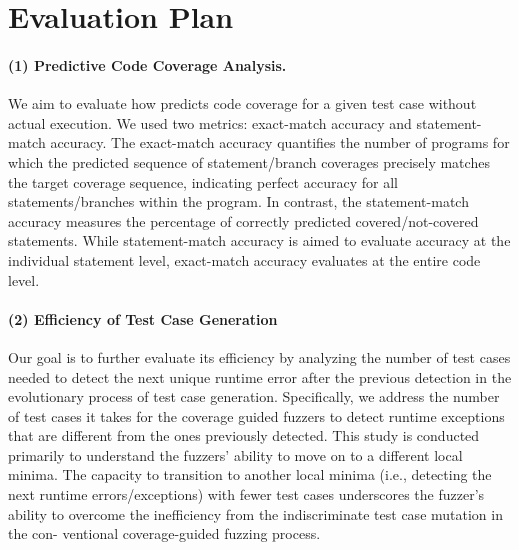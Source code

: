 \section{Evaluation Plan}
\label{eval}






\paragraph{\bf (1) Predictive Code Coverage Analysis.} We aim
to evaluate how {\tool} predicts code coverage for a given
test case without actual execution. We used two metrics: exact-match
accuracy and statement-match accuracy. The exact-match accuracy
quantifies the number of programs for which the predicted sequence of
statement/branch coverages precisely matches the target coverage
sequence, indicating perfect accuracy for all statements/branches
within the program. In contrast, the statement-match accuracy measures
the percentage of correctly predicted covered/not-covered
statements. While statement-match accuracy is aimed to evaluate
accuracy at the individual statement level, exact-match accuracy
evaluates at the entire code level. 

\paragraph{\bf (2) Efficiency of Test Case Generation}
Our goal is to further evaluate its efficiency by analyzing the number
of test cases needed to detect the next unique runtime error after the
previous detection in the evolutionary process of test case
generation. Specifically, we address the number of test cases it takes
for the coverage guided fuzzers to detect runtime exceptions that are
different from the ones previously detected. This study is conducted
primarily to understand the fuzzers' ability to move on to a different
local minima. The capacity to transition to another local minima
(i.e., detecting the next runtime errors/exceptions) with fewer test
cases underscores the fuzzer’s ability to overcome the inefficiency
from the indiscriminate test case mutation in the con- ventional
coverage-guided fuzzing process.

